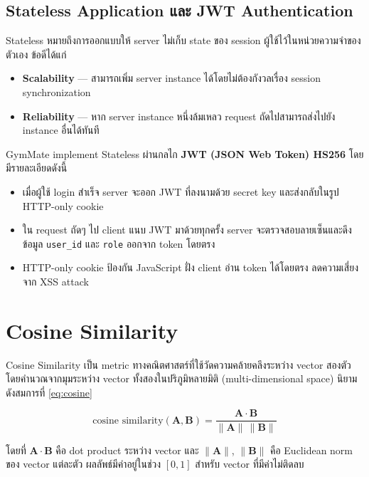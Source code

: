 \subsection{Stateless Application และ JWT Authentication}
\label{subsec:stateless}

Stateless หมายถึงการออกแบบให้ server ไม่เก็บ state ของ session ผู้ใช้ไว้ในหน่วยความจำของตัวเอง ข้อดีได้แก่

\begin{itemize}
  \item \textbf{Scalability} — สามารถเพิ่ม server instance ได้โดยไม่ต้องกังวลเรื่อง session synchronization
  \item \textbf{Reliability} — หาก server instance หนึ่งล้มเหลว request ถัดไปสามารถส่งไปยัง instance อื่นได้ทันที
\end{itemize}

GymMate implement Stateless ผ่านกลไก \textbf{JWT (JSON Web Token) HS256} โดยมีรายละเอียดดังนี้

\begin{itemize}
  \item เมื่อผู้ใช้ login สำเร็จ server จะออก JWT ที่ลงนามด้วย secret key และส่งกลับในรูป HTTP-only cookie
  \item ใน request ถัดๆ ไป client แนบ JWT มาด้วยทุกครั้ง server จะตรวจสอบลายเซ็นและดึงข้อมูล \texttt{user\_id} และ \texttt{role} ออกจาก token โดยตรง
  \item HTTP-only cookie ป้องกัน JavaScript ฝั่ง client อ่าน token ได้โดยตรง ลดความเสี่ยงจาก XSS attack
\end{itemize}

\section{Cosine Similarity}
\label{sec:cosine}

\noindent
Cosine Similarity เป็น metric ทางคณิตศาสตร์ที่ใช้วัดความคล้ายคลึงระหว่าง vector สองตัว โดยคำนวณจากมุมระหว่าง vector ทั้งสองในปริภูมิหลายมิติ (multi-dimensional space) นิยามดังสมการที่ \ref{eq:cosine}

\begin{equation}
  \text{cosine similarity}(\mathbf{A}, \mathbf{B}) = \frac{\mathbf{A} \cdot \mathbf{B}}{\|\mathbf{A}\| \, \|\mathbf{B}\|}
  \label{eq:cosine}
\end{equation}

โดยที่ $\mathbf{A} \cdot \mathbf{B}$ คือ dot product ระหว่าง vector และ $\|\mathbf{A}\|$, $\|\mathbf{B}\|$ คือ Euclidean norm ของ vector แต่ละตัว ผลลัพธ์มีค่าอยู่ในช่วง $[0, 1]$ สำหรับ vector ที่มีค่าไม่ติดลบ

